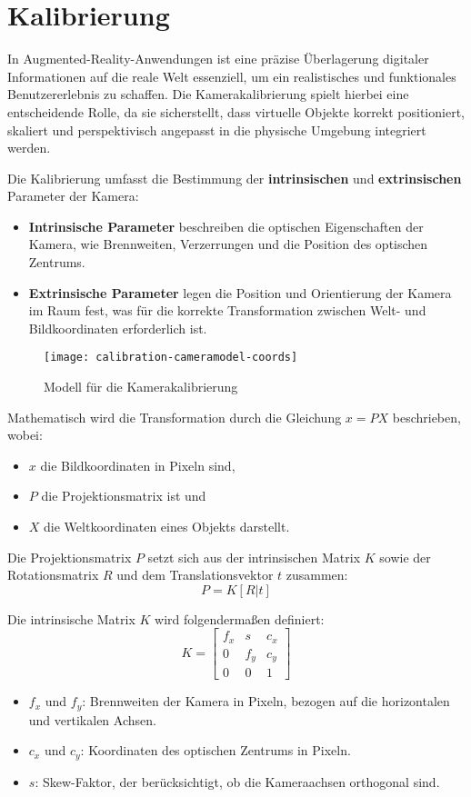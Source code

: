 \section{Kalibrierung}

In Augmented-Reality-Anwendungen ist eine präzise Überlagerung digitaler Informationen auf die reale Welt essenziell, um ein realistisches und funktionales Benutzererlebnis zu schaffen. Die Kamerakalibrierung spielt hierbei eine entscheidende Rolle, da sie sicherstellt, dass virtuelle Objekte korrekt positioniert, skaliert und perspektivisch angepasst in die physische Umgebung integriert werden.

Die Kalibrierung umfasst die Bestimmung der \textbf{intrinsischen} und \textbf{extrinsischen} Parameter der Kamera:
\begin{itemize}
    \item \textbf{Intrinsische Parameter} beschreiben die optischen Eigenschaften der Kamera, wie Brennweiten, Verzerrungen und die Position des optischen Zentrums.
    \item \textbf{Extrinsische Parameter} legen die Position und Orientierung der Kamera im Raum fest, was für die korrekte Transformation zwischen Welt- und Bildkoordinaten erforderlich ist.
\end{itemize}

\begin{figure}
\centering
\texttt{[image: calibration-cameramodel-coords]}
\caption{Modell für die Kamerakalibrierung\label{fig:Kalibrierung}}\par
\end{figure}

Mathematisch wird die Transformation durch die Gleichung \( x = PX \) beschrieben, wobei:
\begin{itemize}
    \item \( x \) die Bildkoordinaten in Pixeln sind,
    \item \( P \) die Projektionsmatrix ist und
    \item \( X \) die Weltkoordinaten eines Objekts darstellt.
\end{itemize}

Die Projektionsmatrix \( P \) setzt sich aus der intrinsischen Matrix \( K \) sowie der Rotationsmatrix \( R \) und dem Translationsvektor \( t \) zusammen:
\[
P = K[R|t]
\]

Die intrinsische Matrix \( K \) wird folgendermaßen definiert:
\[
K = 
\begin{bmatrix}
f_x & s & c_x \\
0 & f_y & c_y \\
0 & 0 & 1
\end{bmatrix}
\]
\begin{itemize}
    \item \( f_x \) und \( f_y \): Brennweiten der Kamera in Pixeln, bezogen auf die horizontalen und vertikalen Achsen.
    \item \( c_x \) und \( c_y \): Koordinaten des optischen Zentrums in Pixeln.
    \item \( s \): Skew-Faktor, der berücksichtigt, ob die Kameraachsen orthogonal sind.
\end{itemize}

